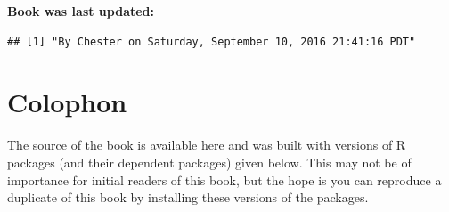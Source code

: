 \documentclass[]{tufte-book}
\begin{document}
\textbf{Book was last updated:}

\begin{verbatim}
## [1] "By Chester on Saturday, September 10, 2016 21:41:16 PDT"
\end{verbatim}

\section*{Colophon}\label{colophon}

The source of the book is available
\href{https://github.com/ismayc/moderndiver-book}{here} and was built
with versions of R packages (and their dependent packages) given below.
This may not be of importance for initial readers of this book, but the
hope is you can reproduce a duplicate of this book by installing these
versions of the packages.
\end{document}
